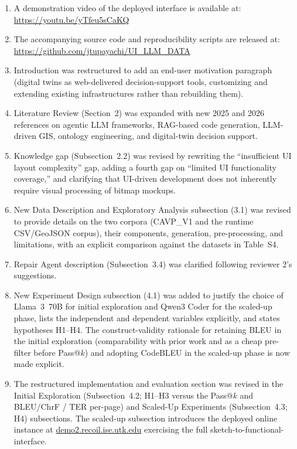 \documentclass{ornl-letter}
\begin{document}
\begin{enumerate}
\item A demonstration video of the deployed interface is available at: \url{https://youtu.be/yTfeu5sCaKQ}

\item The accompanying source code and reproducibility scripts are released at: \url{https://github.com/jtupayachi/UI_LLM_DATA}

\item Introduction was restructured to add an end-user motivation paragraph (digital twins as web-delivered decision-support tools, customizing and extending existing infrastructures rather than rebuilding them).

\item Literature Review (Section~2) was expanded with new 2025 and 2026 references on agentic LLM frameworks, RAG-based code generation, LLM-driven GIS, ontology engineering, and digital-twin decision support.

\item Knowledge gap (Subsection~2.2) was revised by rewriting the ``insufficient UI layout complexity'' gap, adding a fourth gap on ``limited UI functionality coverage,'' and clarifying that UI-driven development does not inherently require visual processing of bitmap mockups.

\item New Data Description and Exploratory Analysis subsection (3.1) was revised to provide details on  the two corpora (\textsc{CAVP\_V1} and the runtime CSV/GeoJSON corpus), their components, generation, pre-processing, and limitations, with an explicit comparison against the datasets in Table~S4.

\item Repair Agent description (Subsection~3.4) was clarified following reviewer 2's suggestions.

\item New Experiment Design subsection (4.1) was added to justify the choice of Llama~3~70B for initial exploration and Qwen3 Coder for the scaled-up phase, lists the independent and dependent variables explicitly, and states hypotheses H1--H4. The construct-validity rationale for retaining BLEU in the initial exploration (comparability with prior work and as a cheap pre-filter before Pass@$k$) and adopting CodeBLEU in the scaled-up phase is now made explicit.

\item The restructured implementation and evaluation section was revised in the Initial Exploration (Subsection~4.2; H1--H3 versus the Pass@$k$ and BLEU/ChrF / TER per-page) and Scaled-Up Experiments (Subsection~4.3; H4) subsections. The scaled-up subsection introduces the deployed online instance at \url{demo2.recoil.ise.utk.edu} exercising the full sketch-to-functional-interface. 


\end{enumerate}
\end{document}
